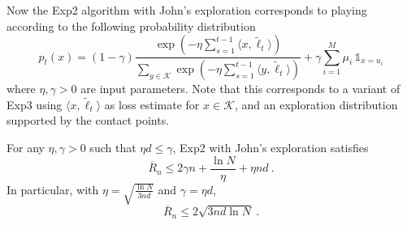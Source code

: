 \documentclass[11pt]{hackednow}
\newcommand{\cK}{\mathcal{K}}
\newcommand{\oR}{\overline{R}}
\def\ds1{\mathds{1}}
\renewcommand{\tilde}{\widetilde}
\begin{document}
Now the Exp2 algorithm with John's exploration corresponds to playing according to the following probability distribution
\begin{equation}
\label{eq:exp2def}
p_t(x) = (1- \gamma) \frac{\exp\left(- \eta \sum_{s=1}^{t-1} \langle x, \tilde{\ell}_t \rangle  \right)}{\sum_{y \in \cK} \exp\left(- \eta \sum_{s=1}^{t-1} \langle y, \tilde{\ell}_t \rangle  \right)} + \gamma \sum_{i=1}^M \mu_i\,\ds1_{x = u_i}
\end{equation}
where $\eta,\gamma > 0$ are input parameters. Note that this corresponds to a variant of Exp3 using $\langle x, \tilde{\ell}_t \rangle$ as loss estimate for $x \in \cK$, and an exploration distribution supported by the contact points.
%
\begin{theorem} \label{th:exp2john}
For any $\eta,\gamma > 0$ such that ${\eta d} \le {\gamma}$, Exp2 with John's exploration satisfies
$$\oR_n \leq 2 \gamma n + \frac{\ln N}{\eta} + \eta n d~.$$
In particular, with $\eta = \sqrt{\frac{\ln N}{3 n d}}$ and $\gamma = \eta d$,
$$\oR_n \leq 2 \sqrt{3 n d \ln N}~.$$
\end{theorem}
%
\end{document}
